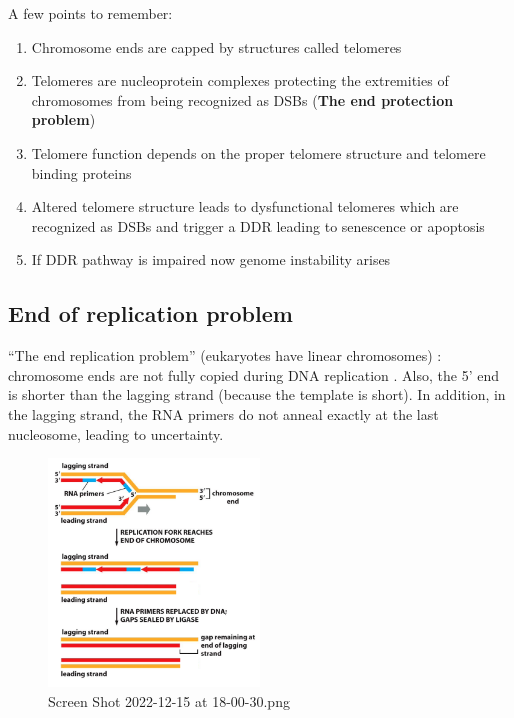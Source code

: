A few points to remember:

\begin{enumerate}
\def\labelenumi{\arabic{enumi}.}
\tightlist
\item
  Chromosome ends are capped by structures called telomeres
\item
  Telomeres are nucleoprotein complexes protecting the extremities of
  chromosomes from being recognized as DSBs (\textbf{The end protection
  problem})
\item
  Telomere function depends on the proper telomere structure and
  telomere binding proteins
\item
  Altered telomere structure leads to dysfunctional telomeres which are
  recognized as DSBs and trigger a DDR leading to senescence or
  apoptosis
\item
  If DDR pathway is impaired now genome instability arises
\end{enumerate}

\hypertarget{end-of-replication-problem}{%
\subsection{End of replication problem}\label{end-of-replication-problem}}

``The end replication problem'' (eukaryotes have linear chromosomes) :
chromosome ends are not fully copied during DNA replication . Also, the
5' end is shorter than the lagging strand (because the template is
short). In addition, in the lagging strand, the RNA primers do not
anneal exactly at the last nucleosome, leading to uncertainty.

\begin{figure}
\centering
\includegraphics[width=0.5\textwidth]{../_resources/Screen_Shot_2022-12-15_at_18-00-30.png}
\caption{Screen Shot 2022-12-15 at 18-00-30.png}
\end{figure}

